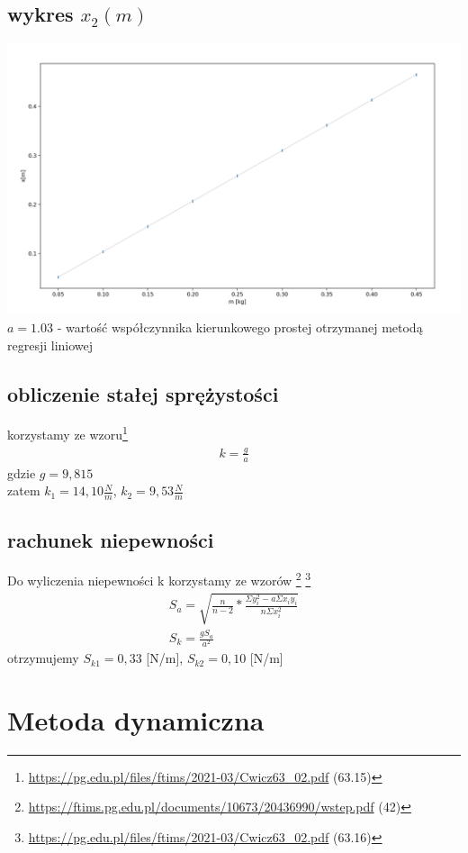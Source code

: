 \documentclass{article}
\begin{document}
\subsection{wykres $x_2(m)$}
\includegraphics[width=15cm]{m7_1_2}
$a = 1.03$ - wartość współczynnika kierunkowego prostej otrzymanej metodą regresji liniowej
\subsection{obliczenie stałej sprężystości}
korzystamy ze wzoru\footnote{\url{https://pg.edu.pl/files/ftims/2021-03/Cwicz63_02.pdf} (63.15)}
\begin{gather*}
	k = \frac{g}{a}
\end{gather*} 
gdzie $g = 9,815$\\
zatem $k_1=14,10 \frac{N}{m}$, $k_2 = 9,53 \frac{N}{m}$

\subsection{rachunek niepewności}

Do wyliczenia niepewności k korzystamy ze wzorów \footnote{\url{https://ftims.pg.edu.pl/documents/10673/20436990/wstep.pdf} (42)} \footnote{\url{https://pg.edu.pl/files/ftims/2021-03/Cwicz63_02.pdf} (63.16)}
\begin{gather*}
S_a = \sqrt{\frac{n}{n-2} * \frac{\Sigma y_i^2 - a\Sigma x_iy_i}{n\Sigma x_i^2}} \\
S_k = \frac{gS_a}{a^2}
\end{gather*}
otrzymujemy $S_{k1} = 0,33$ [N/m],  $S_{k2} = 0,10$ [N/m]

\section{Metoda dynamiczna}
\end{document}
